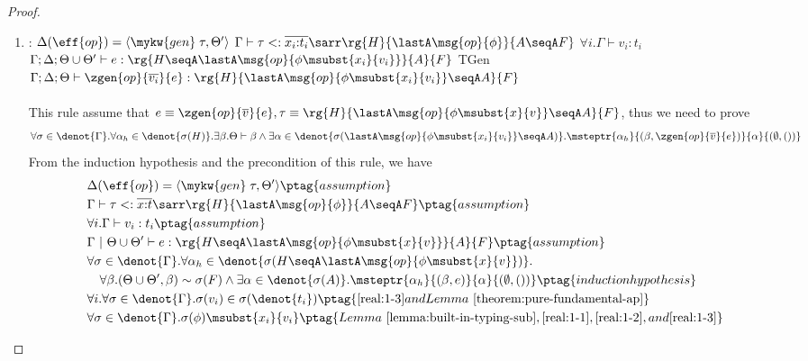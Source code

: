 \begin{proof}
\begin{enumerate}[label=Case]
\item:
{\footnotesize
\mprooftr{87mm}
{
$\Delta(\eff{op}) =\langle \mykw{gen}\;\tau, \Theta' \rangle$ \quad
$\Gamma \vdash \tau <: \overline{x_i{:}t_i}\sarr
\rg{H}{\lastA\msg{op}{\phi}}{A \seqA F}$ \quad
$\forall i. \Gamma \vdash v_i : t_i$ \quad
 $\Gamma; \Delta; \Theta \cup \Theta' \vdash e : \rg{H \seqA \lastA\msg{op}{\phi\msubst{x_i}{v_i}}}{A}{F}$
 }
{TGen}
{$\Gamma; \Delta; \Theta \vdash \zgen{op}{\overline{v_i}}{e} : \rg{H}{\lastA\msg{op}{\phi\msubst{x_i}{v_i}} \seqA A}{F}$}
\ \\ \ \\}
This rule assume that $e \equiv \zgen{op}{\overline{v}}{e}, \tau \equiv \rg{H}{\lastA\msg{op}{\phi\msubst{x}{v}} \seqA A}{F}$, thus we need to prove
{\footnotesize\begin{align*}
     \forall \sigma \in \denot{\Gamma}.\forall \alpha_h \in \denot{\sigma(H)}. \exists \beta. \Theta \vdash \beta \land \exists \alpha \in\denot{\sigma(\lastA\msg{op}{\phi\msubst{x_i}{v_i}} \seqA A)}. \msteptr{\alpha_h}{(\beta, \zgen{op}{\overline{v}}{e})}{\alpha}{(\emptyset, ())}
\end{align*}}\noindent
From the induction hypothesis and the precondition of this rule, we have
{\footnotesize\begin{alignat}{2}
\setcounter{equation}{0}
&\Delta(\eff{op}) =\langle \mykw{gen}\;\tau, \Theta' \rangle \ptag{assumption} \label{real:1-1} \\
&\Gamma \vdash \tau <: \overline{x{:}t}\sarr \rg{H}{\lastA\msg{op}{\phi}}{A \seqA F} \ptag{assumption} \label{real:1-2} \\
&\forall i. \Gamma \vdash v_i : t_i \ptag{assumption} \label{real:1-3} \\
&\Gamma ~|~ \Theta \cup \Theta' \vdash e : \rg{H \seqA \lastA\msg{op}{\phi\msubst{x}{v}}}{A}{F} \ptag{assumption} \label{real:1-4} \\
&\forall \sigma \in \denot{\Gamma}.\forall \alpha_h \in \denot{\sigma(H \seqA \lastA\msg{op}{\phi\msubst{x}{v}})}. \notag
\\&\quad \forall \beta. (\Theta \cup \Theta', \beta) \sim \sigma(F) \land \exists \alpha \in\denot{\sigma(A)}. \msteptr{\alpha_h}{(\beta, e)}{\alpha}{(\emptyset, ())}
\ptag{induction hypothesis} \label{real:1-5} \\
&\forall i. \forall \sigma \in \denot{\Gamma}. \sigma(v_i) \in  \sigma(\denot{t_i}) \ptag{\ref{real:1-3} and Lemma~\ref{theorem:pure-fundamental-ap}} \label{real:1-6} \\
&\forall \sigma \in \denot{\Gamma}. \sigma(\phi)\msubst{x_i}{v_i} \ptag{Lemma~\ref{lemma:built-in-typing-sub}, \ref{real:1-1}, \ref{real:1-2}, and \ref{real:1-3}} \label{real:1-7}

\end{alignat}}
\end{enumerate}
\end{proof}
